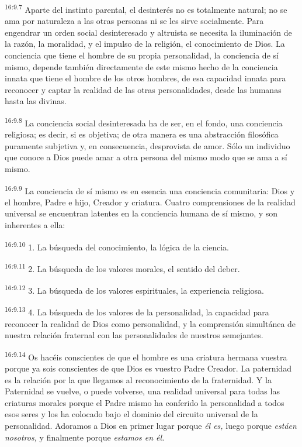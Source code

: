 \par
\textsuperscript{16:9.7} Aparte del instinto parental, el desinterés no es totalmente natural; no se ama por naturaleza a las otras personas ni se les sirve socialmente. Para engendrar un orden social desinteresado y altruista se necesita la iluminación de la razón, la moralidad, y el impulso de la religión, el conocimiento de Dios. La conciencia que tiene el hombre de su propia personalidad, la conciencia de sí mismo, depende también directamente de este mismo hecho de la conciencia innata que tiene el hombre de los otros hombres, de esa capacidad innata para reconocer y captar la realidad de las otras personalidades, desde las humanas hasta las divinas.

\par
\textsuperscript{16:9.8} La conciencia social desinteresada ha de ser, en el fondo, una conciencia religiosa; es decir, si es objetiva; de otra manera es una abstracción filosófica puramente subjetiva y, en consecuencia, desprovista de amor. Sólo un individuo que conoce a Dios puede amar a otra persona del mismo modo que se ama a sí mismo.

\par
\textsuperscript{16:9.9} La conciencia de sí mismo es en esencia una conciencia comunitaria: Dios y el hombre, Padre e hijo, Creador y criatura. Cuatro comprensiones de la realidad universal se encuentran latentes en la conciencia humana de sí mismo, y son inherentes a ella:

\par
\textsuperscript{16:9.10} 1. La búsqueda del conocimiento, la lógica de la ciencia.

\par
\textsuperscript{16:9.11} 2. La búsqueda de los valores morales, el sentido del deber.

\par
\textsuperscript{16:9.12} 3. La búsqueda de los valores espirituales, la experiencia religiosa.

\par
\textsuperscript{16:9.13} 4. La búsqueda de los valores de la personalidad, la capacidad para reconocer la realidad de Dios como personalidad, y la comprensión simultánea de nuestra relación fraternal con las personalidades de nuestros semejantes.

\par
\textsuperscript{16:9.14} Os hacéis conscientes de que el hombre es una criatura hermana vuestra porque ya sois conscientes de que Dios es vuestro Padre Creador. La paternidad es la relación por la que llegamos al reconocimiento de la fraternidad. Y la Paternidad se vuelve, o puede volverse, una realidad universal para todas las criaturas morales porque el Padre mismo ha conferido la personalidad a todos esos seres y los ha colocado bajo el dominio del circuito universal de la personalidad. Adoramos a Dios en primer lugar porque \textit{él es,} luego porque \textit{estáen nosotros,} y finalmente porque \textit{estamos en él.}

